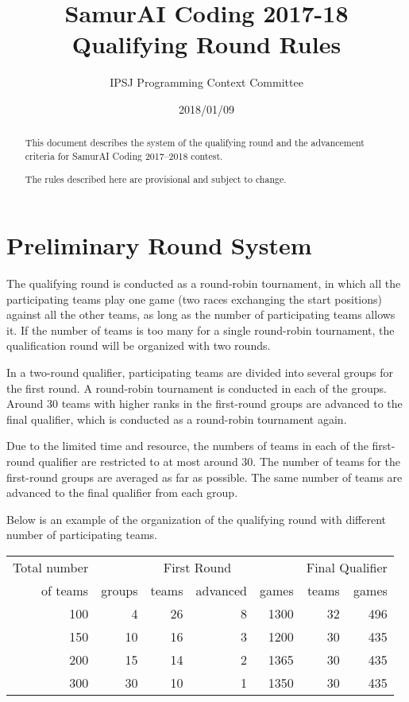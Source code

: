 \documentclass[11pt]{article}
\title{SamurAI Coding 2017-18 Qualifying Round Rules}
\author{IPSJ Programming Context Committee}
\date{2018/01/09}
\begin{document}
\maketitle

\begin{abstract}
  This document describes the system of the qualifying round and the
  advancement criteria for SamurAI Coding 2017--2018 contest.

  The rules described here are provisional and subject to change.
\end{abstract}

\section{Preliminary Round System}

The qualifying round is conducted as a round-robin tournament, in
which all the participating teams play one game (two races exchanging
the start positions) against all the other teams, as long as the
number of participating teams allows it.  If the number of teams is
too many for a single round-robin tournament, the qualification round
will be organized with two rounds.

In a two-round qualifier, participating teams are divided into several
groups for the first round.  A round-robin tournament is conducted in
each of the groups.  Around 30 teams with higher ranks in the
first-round groups are advanced to the final qualifier, which is
conducted as a round-robin tournament again.

Due to the limited time and resource, the numbers of teams in each of
the first-round qualifier are restricted to at most around 30.  The
number of teams for the first-round groups are averaged as far as
possible.  The same number of teams are advanced to the final
qualifier from each group.

Below is an example of the organization of the qualifying round with
different number of participating teams.

\begin{table}[h]
  \begin{center}
    \begin{tabular}{r|rrrr|rr}
      \multicolumn{1}{c|}{Total number}&\multicolumn{4}{c|}{First Round}&\multicolumn{2}{c}{Final Qualifier}\\
      of teams&groups&teams&advanced&games&teams&games\\
      \hline
      100&4&26&8&1300&32&496\\
      150&10&16&3&1200&30&435\\
      200&15&14&2&1365&30&435\\
      300&30&10&1&1350&30&435\\
    \end{tabular}
  \end{center}
\end{table}
\end{document}
